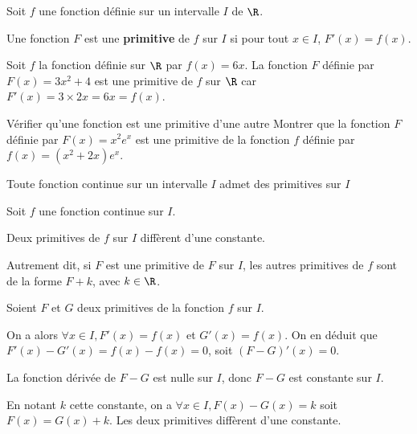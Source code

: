 \documentclass[a4paper]{article}
\begin{document}
\begin{definition*}{}{}
  Soit $f$ une fonction définie sur un intervalle $I$ de $\R$.

  Une fonction $F$ est une \textbf{primitive} de $f$ sur $I$ si pour tout $x \in I$, $F'(x)=f(x)$.
\end{definition*}

\begin{example*}{}{}
  Soit $f$ la fonction définie sur $\R$ par $f(x)=6x$. La fonction $F$ définie par $F(x)=3x^2+4$ est une primitive de $f$ 
  sur $\R$ car $F'(x)=3\times2x=6x=f(x)$.
\end{example*}


\begin{methode*}[sidebyside, righthand width=2.2cm,segmentation code={}, sidebyside align=top]{Vérifier qu'une fonction est une primitive d'une autre}{}
    Montrer que la fonction $F$ définie par $F(x)=x^2e^x$ est une primitive de la fonction $f$ définie par $f(x)=(x^2+2x)e^x$.
        \tcblower
        \vspace{3cm}
      
    \end{methode*}
    

\begin{proprieteadm*}{}{}
Toute fonction continue sur un intervalle $I$ admet des primitives sur $I$
\end{proprieteadm*}

\begin{propriete*}{}{}
Soit $f$ une fonction continue sur $I$.

Deux primitives de $f$ sur $I$ diffèrent d'une constante.

Autrement dit, si $F$ est une primitive de $F$ sur $I$, les autres primitives de $f$ sont de la forme $F+k$, avec $k\in \R$.
\end{propriete*}

\begin{demonstrationp*}{}{}
Soient $F$ et $G$ deux primitives de la fonction $f$ sur $I$.

On a alors $\forall x \in I, F'(x)=f(x)$ et $G'(x)=f(x)$. On en déduit que $F'(x)-G'(x)=f(x)-f(x)=0$, soit $(F-G)'(x)=0$.

La fonction dérivée de $F-G$ est nulle sur $I$, donc $F-G$ est constante sur $I$. 

En notant $k$ cette constante, on a $\forall x \in I, F(x)-G(x)=k$ soit $F(x)=G(x)+k$. Les deux primitives diffèrent d'une constante.
\end{demonstrationp*}
\end{document}
